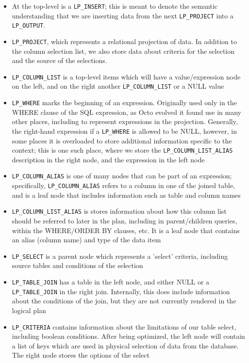 \documentclass[]{article}
\def\code#1{\texttt{#1}}
\begin{document}
\begin{itemize}
	\item At the top-level is a \code{LP\_INSERT}; this is meant to denote the semantic understanding that we are inserting data from the next \code{LP\_PROJECT} into a \code{LP\_OUTPUT}.
	\item \code{LP\_PROJECT}, which represents a relational projection of data. In addition to the column selection list, we also store data about criteria for the selection and the source of the selections.
	\item \code{LP\_COLUMN\_LIST} is a top-level items which will have a value/expression node on the left, and on the right another \code{LP\_COLUMN\_LIST} or a NULL value
	\item \code{LP\_WHERE} marks the beginning of an expression. Originally used only in the WHERE clause of the SQL expression, as Octo evolved it found use in many other places, including to represent expressions in the projection. Generally, the right-hand expression if a \code{LP\_WHERE} is allowed to be NULL, however, in some places it is overloaded to store additional information specific to the context; this is one such place, where we store the \code{LP\_COLUMN\_LIST\_ALIAS} description in the right node, and the expression in the left node
	\item \code{LP\_COLUMN\_ALIAS} is one of many nodes that can be part of an expression; specifically, \code{LP\_COLUMN\_ALIAS} refers to a column in one of the joined table, and is a leaf node that includes information such as table and column names
	\item \code{LP\_COLUMN\_LIST\_ALIAS} is stores information about how this column list should be referred to later in the plan, including in parent/children queries, within the WHERE/ORDER BY clauses, etc. It is a leaf node that contains an alias (column name) and type of the data item
	\item \code{LP\_SELECT} is a parent node which represents a 'select' criteria, including source tables and conditions of the selection
	\item \code{LP\_TABLE\_JOIN} has a table in the left node, and either NULL or a \code{LP\_TABLE\_JOIN} in the right join. Internally, this does include information about the conditions of the join, but they are not currently rendered in the logical plan
	\item \code{LP\_CRITERIA} contains information about the limitations of our table select, including boolean conditions. After being optimized, the left node will contain a list of keys which are used in physical selection of data from the database. The right node stores the options of the select

\end{itemize}
\end{document}
